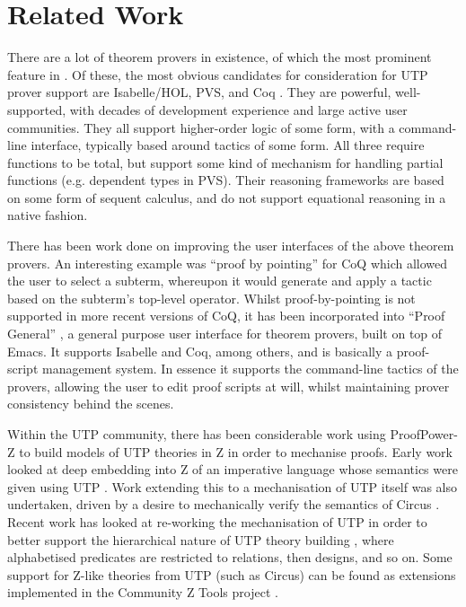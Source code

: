 \section{Related Work}
\label{sec:related}

There are a lot of theorem provers in existence,
of which the most prominent feature in \cite{conf/tphol/2006provers}.
Of these, the most obvious candidates for consideration for UTP prover support
are Isabelle/HOL\cite{books/sp/NipkowPW02},
PVS\cite{conf/fmcad/Shankar96},
and Coq \cite{bk:Coq'Art:04}.
They are powerful, well-supported,
with decades of development experience
and large active user communities.
They all support higher-order logic of some form, with a command-line interface,
typically based around tactics of some form. All three require functions to be total,
but support some kind of mechanism for handling partial functions
(e.g. dependent types in PVS).
Their reasoning frameworks are based on some form of sequent calculus,
and do not support equational reasoning in a native fashion.

There has been work done on improving the user interfaces
of the above theorem provers.
An interesting example was ``proof by pointing'' \cite{conf/tacs/BertotKT94}
for CoQ which allowed the user to select a subterm,
whereupon it would generate and apply a tactic based on the subterm's top-level
operator.
Whilst proof-by-pointing is not supported in more recent versions of CoQ,
it has been incorporated into ``Proof General'' \cite{conf/tacas/Aspinall00},
a general purpose user interface for theorem provers, built on top of Emacs.
It supports Isabelle and Coq, among others,
and is basically a proof-script management system.
In essence it supports the command-line tactics of the provers,
allowing the user to edit proof scripts at will,
whilst maintaining prover consistency behind the scenes.

Within the UTP community,
there has been considerable work using Proof{\-}Power-Z to
build models of UTP theories in Z in order to mechanise proofs.
Early work looked at deep embedding into Z of an imperative language whose semantics
were given using UTP \cite{conf/utp/NukaW06}.
Work extending this to a mechanisation of UTP itself was also undertaken,
driven by a desire to mechanically verify the semantics of Circus \cite{journals/fac/OliveiraCW09}.
Recent work has looked at re-working the mechanisation of UTP in order to better support
the hierarchical nature of UTP theory building \cite{journals/entcs/ZeydaC09},
where alphabetised predicates are restricted to relations, then designs, and so on.
Some support for Z-like theories from UTP (such as Circus)
can be found as extensions implemented in the Community Z Tools project
\cite{conf/zum/MalikU05}.


